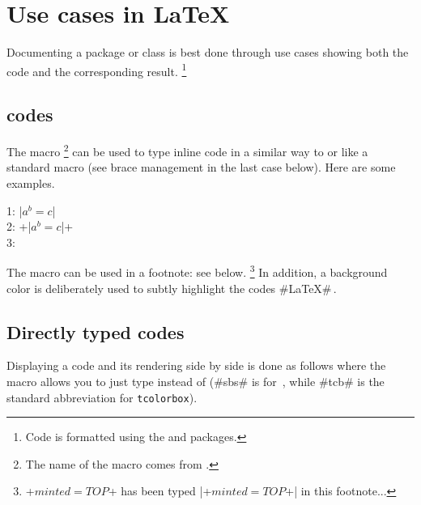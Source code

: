 \documentclass{tutodoc}
\begin{document}
\section{Use cases in \LaTeX}
\label{tutodoc-listing-latex}

Documenting a package or class is best done through use cases showing both the code and the corresponding result.
\footnote{
    Code is formatted using the  and  packages.
}


\subsection{ codes}
\label{tutodoc-listing-latex-inline}

The  macro
\footnote{
    The name of the macro  comes from .
}
can be used to type inline code in a similar way to  or like a standard macro (see brace management in the last case below).
Here are some examples.


\begin{tdoclatex}
    1: \tdoclatexin|$a^b = c$|               \\
    2: \tdoclatexin+\tdoclatexin|$a^b = c$|+ \\
    3: 
\end{tdoclatex}


\begin{tdocnote}
    The  macro can be used in a footnote: see below.
    \footnote{
        \tdoclatexin+$minted = TOP$+ has been typed \tdoclatexin|\tdoclatexin+$minted = TOP$+| in this footnote...
    }
    In addition, a background color is deliberately used to subtly highlight the codes \tdoclatexin#\LaTeX#\,.
\end{tdocnote}




\subsection{Directly typed codes}

\begin{tdocexa}
    Displaying a code and its rendering side by side is done as follows where the macro  allows you to just type  instead of  (\tdoclatexin#sbs# is for \,, while \tdoclatexin#tcb# is the standard abbreviation for \texttt{tcolorbox}).

\end{tdocexa}
\end{document}
